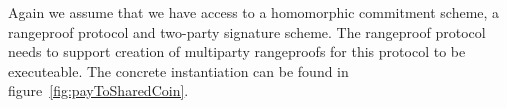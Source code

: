 Again we assume that we have access to a homomorphic commitment scheme, a rangeproof protocol and two-party signature scheme. The rangeproof protocol needs to support creation
of multiparty rangeproofs for this protocol to be executeable. The concrete instantiation can be found in figure~\ref{fig:payToSharedCoin}.
\begin{figure}
    \begin{center}
\end{center}
\end{figure}
